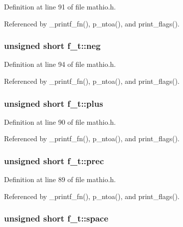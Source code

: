 Definition at line 91 of file mathio.\+h.



Referenced by \+\_\+printf\+\_\+fn(), p\+\_\+ntoa(), and print\+\_\+flags().

\subsubsection[{\texorpdfstring{neg}{neg}}]{\setlength{\rightskip}{0pt plus 5cm}unsigned short f\+\_\+t\+::neg}\hypertarget{unionf__t_a08d5e77f0fdb784ab1ef1425625e23f7}{}\label{unionf__t_a08d5e77f0fdb784ab1ef1425625e23f7}


Definition at line 94 of file mathio.\+h.



Referenced by \+\_\+printf\+\_\+fn(), p\+\_\+ntoa(), and print\+\_\+flags().

\subsubsection[{\texorpdfstring{plus}{plus}}]{\setlength{\rightskip}{0pt plus 5cm}unsigned short f\+\_\+t\+::plus}\hypertarget{unionf__t_a63ebe04d55417685e439b779dfa8dafe}{}\label{unionf__t_a63ebe04d55417685e439b779dfa8dafe}


Definition at line 90 of file mathio.\+h.



Referenced by \+\_\+printf\+\_\+fn(), p\+\_\+ntoa(), and print\+\_\+flags().

\subsubsection[{\texorpdfstring{prec}{prec}}]{\setlength{\rightskip}{0pt plus 5cm}unsigned short f\+\_\+t\+::prec}\hypertarget{unionf__t_afd9cfffafc044b616256b483e5444d92}{}\label{unionf__t_afd9cfffafc044b616256b483e5444d92}


Definition at line 89 of file mathio.\+h.



Referenced by \+\_\+printf\+\_\+fn(), p\+\_\+ntoa(), and print\+\_\+flags().

\subsubsection[{\texorpdfstring{space}{space}}]{\setlength{\rightskip}{0pt plus 5cm}unsigned short f\+\_\+t\+::space}\hypertarget{unionf__t_aba20a97e95d14a076e9c175989022717}{}\label{unionf__t_aba20a97e95d14a076e9c175989022717}


